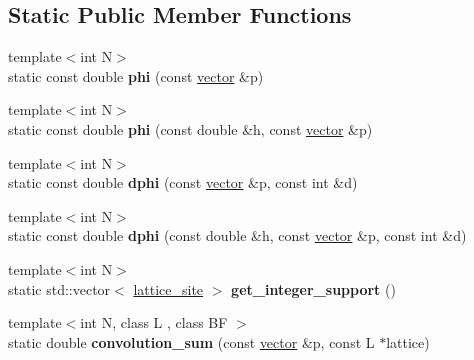 \subsection*{Static Public Member Functions}
\begin{DoxyCompactItemize}
\item 
\mbox{\label{classsisl_1_1zp3__element_a99fd4709ef8de0d88dd34fd60a9f0416}} 
{\footnotesize template$<$int N$>$ }\\static const double {\bfseries phi} (const \hyperlink{namespacesisl_a2069bd5374a9be042ff3ce3306d41e1a}{vector} \&p)
\item 
\mbox{\label{classsisl_1_1zp3__element_ac26a648ab1147bd5ca1ee7e99ab20807}} 
{\footnotesize template$<$int N$>$ }\\static const double {\bfseries phi} (const double \&h, const \hyperlink{namespacesisl_a2069bd5374a9be042ff3ce3306d41e1a}{vector} \&p)
\item 
\mbox{\label{classsisl_1_1zp3__element_a6a1d18a8deb3bfc5bede41c552d577de}} 
{\footnotesize template$<$int N$>$ }\\static const double {\bfseries dphi} (const \hyperlink{namespacesisl_a2069bd5374a9be042ff3ce3306d41e1a}{vector} \&p, const int \&d)
\item 
\mbox{\label{classsisl_1_1zp3__element_a5c28b9e7412e474a6c5f05a8b69c483d}} 
{\footnotesize template$<$int N$>$ }\\static const double {\bfseries dphi} (const double \&h, const \hyperlink{namespacesisl_a2069bd5374a9be042ff3ce3306d41e1a}{vector} \&p, const int \&d)
\item 
\mbox{\label{classsisl_1_1zp3__element_ad07351efdd0fe9a39a45397afeceba63}} 
{\footnotesize template$<$int N$>$ }\\static std\+::vector$<$ \hyperlink{namespacesisl_acd18feee4026583db6185df2b25434aa}{lattice\+\_\+site} $>$ {\bfseries get\+\_\+integer\+\_\+support} ()
\item 
\mbox{\label{classsisl_1_1zp3__element_adba6602f5ff3802d5452c1bc1cc34986}} 
{\footnotesize template$<$int N, class L , class BF $>$ }\\static double {\bfseries convolution\+\_\+sum} (const \hyperlink{namespacesisl_a2069bd5374a9be042ff3ce3306d41e1a}{vector} \&p, const L $\ast$lattice)

\end{DoxyCompactItemize}
